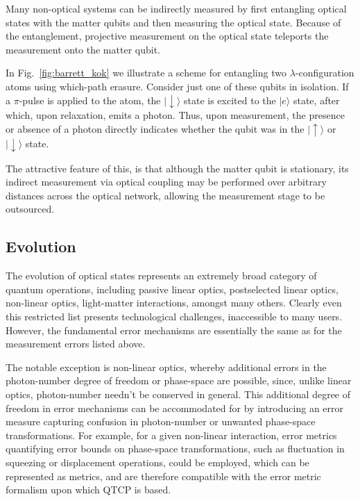 \documentclass[aps,rmp,twocolumn,amsmath,amssymb,nofootinbib,superscriptaddress]{revtex4}
\newcommand{\ket}[1]{|#1\rangle}
\begin{document}
Many non-optical systems can be indirectly measured by first entangling optical states with the matter qubits and then measuring the optical state. Because of the entanglement, projective measurement on the optical state teleports the measurement onto the matter qubit.

In Fig.~\ref{fig:barrett_kok} we illustrate a scheme for entangling two $\lambda$-configuration atoms using which-path erasure. Consider just one of these qubits in isolation. If a $\pi$-pulse is applied to the atom, the $\ket{\downarrow}$ state is excited to the $\ket{e}$ state, after which, upon relaxation, emits a photon. Thus, upon measurement, the presence or absence of a photon directly indicates whether the qubit was in the $\ket\uparrow$ or $\ket\downarrow$ state.

The attractive feature of this, is that although the matter qubit is stationary, its indirect measurement via optical coupling may be performed over arbitrary distances across the optical network, allowing the measurement stage to be outsourced.

%
%

\subsection{Evolution}

The evolution of optical states represents an extremely broad category of quantum operations, including passive linear optics, postselected linear optics, non-linear optics, light-matter interactions, amongst many others. Clearly even this restricted list presents technological challenges, inaccessible to many users. However, the fundamental error mechanisms are essentially the same as for the measurement errors listed above.

The notable exception is non-linear optics, whereby additional errors in the photon-number degree of freedom or phase-space are possible, since, unlike linear optics, photon-number needn't be conserved in general. This additional degree of freedom in error mechanisms can be accommodated for by introducing an error measure capturing confusion in photon-number or unwanted phase-space transformations. For example, for a given non-linear interaction, error metrics quantifying error bounds on phase-space transformations, such as fluctuation in squeezing or displacement operations, could be employed, which can be represented as metrics, and are therefore compatible with the error metric formalism upon which QTCP is based.
\end{document}
